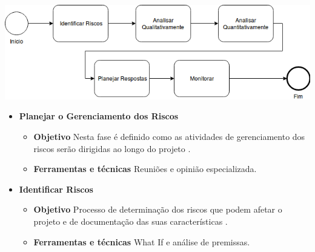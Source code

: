 \begin{apendicesenv}
\begin{center}
	\includegraphics[scale=0.5]{figuras/processo-gerencia-riscos}
\end{center}

\begin{itemize}
    \item \textbf{Planejar o Gerenciamento dos Riscos}
        \begin{itemize}
            \item \textbf{Objetivo}
            Nesta fase é definido como as atividades de gerenciamento dos riscos serão dirigidas ao longo do projeto \cite{pmbok2004guia}.
            \item \textbf{Ferramentas e técnicas}
            Reuniões e opinião especializada.
        \end{itemize}
    
    \item \textbf{Identificar Riscos}
        \begin{itemize}
            \item \textbf{Objetivo}
            Processo de determinação dos riscos que podem afetar o projeto e de documentação das suas características \cite{pmbok2004guia}.
            \item \textbf{Ferramentas e técnicas}
            What If e análise de premissas.
        \end{itemize}


\end{itemize}
\end{apendicesenv}

